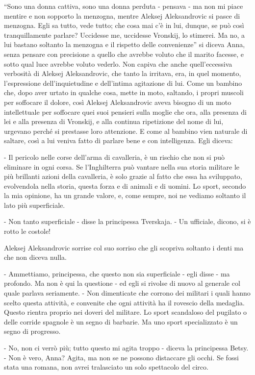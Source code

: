 ``Sono una donna cattiva, sono una donna perduta - pensava - ma non mi piace mentire e non sopporto la menzogna, mentre Aleksej Aleksandrovic si pasce di menzogna. Egli sa tutto, vede tutto; che cosa mai c'è in lui, dunque, se può così tranquillamente parlare? Uccidesse me, uccidesse Vronskij, lo stimerei. Ma no, a lui bastano soltanto la menzogna e il rispetto delle convenienze'' si diceva Anna, senza pensare con precisione a quello che avrebbe voluto che il marito facesse, e sotto qual luce avrebbe voluto vederlo. Non capiva che anche quell'eccessiva verbosità di Aleksej Aleksandrovic, che tanto la irritava, era, in quel momento, l'espressione dell'inquietudine e dell'intima agitazione di lui. Come un bambino che, dopo aver urtato in qualche cosa, mette in moto, saltando, i propri muscoli per soffocare il dolore, così Aleksej Aleksandrovic aveva bisogno di un moto intellettuale per soffocare quei suoi pensieri sulla moglie che ora, alla presenza di lei e alla presenza di Vronskij, e alla continua ripetizione del nome di lui, urgevano perché si prestasse loro attenzione. E come al bambino vien naturale di saltare, così a lui veniva fatto di parlare bene e con intelligenza. Egli diceva: 

- Il pericolo nelle corse dell'arma di cavalleria, è un rischio che non si può eliminare in ogni corsa. Se l'Inghilterra può vantare nella sua storia militare le più brillanti azioni della cavalleria, è solo grazie al fatto che essa ha sviluppato, evolvendola nella storia, questa forza e di animali e di uomini. Lo sport, secondo la mia opinione, ha un grande valore, e, come sempre, noi ne vediamo soltanto il lato più superficiale. 

- Non tanto superficiale - disse la principessa Tverskaja. - Un ufficiale, dicono, si è rotto le costole! 

Aleksej Aleksandrovic sorrise col suo sorriso che gli scopriva soltanto i denti ma che non diceva nulla. 

- Ammettiamo, principessa, che questo non sia superficiale - egli disse - ma profondo. Ma non è qui la questione - ed egli si rivolse di nuovo al generale col quale parlava seriamente. - Non dimenticate che corrono dei militari i quali hanno scelto questa attività, e convenite che ogni attività ha il rovescio della medaglia. Questo rientra proprio nei doveri del militare. Lo sport scandaloso del pugilato o delle corride spagnole è un segno di barbarie. Ma uno sport specializzato è un segno di progresso. 

- No, non ci verrò più; tutto questo mi agita troppo - diceva la principessa Betsy. - Non è vero, Anna? Agita, ma non se ne possono distaccare gli occhi. Se fossi stata una romana, non avrei tralasciato un solo spettacolo del circo. 

